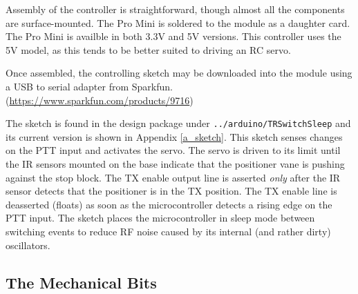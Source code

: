 \documentclass[12pt]{article}
\begin{document}
Assembly of the controller is straightforward, though almost all the components
are surface-mounted. The Pro Mini is soldered to the module as a daughter card.
The Pro Mini is availble in both 3.3V and 5V versions.  This controller uses the
5V model, as this tends to be better suited to driving an RC servo.

Once assembled, the controlling sketch may be downloaded into the module using a
USB to serial adapter from Sparkfun. (\url{https://www.sparkfun.com/products/9716})

The sketch is found in the design package under {\tt ../arduino/TRSwitchSleep}
and its current version is shown in Appendix \ref{a_sketch}. 
This sketch senses changes on the PTT input and activates the servo.
The servo is driven to its limit until the IR sensors mounted on the base indicate
that the positioner vane is pushing against the stop block. 
The TX enable output line is asserted {\em only} after the IR sensor detects
that the positioner is in the TX position.  The TX enable line is deasserted
(floats) as soon as the microcontroller detects a rising edge on the PTT input.
The sketch places the microcontroller in sleep mode between switching events to
reduce RF noise caused by its internal (and rather dirty) oscillators. 

\subsection{The Mechanical Bits}
\end{document}

